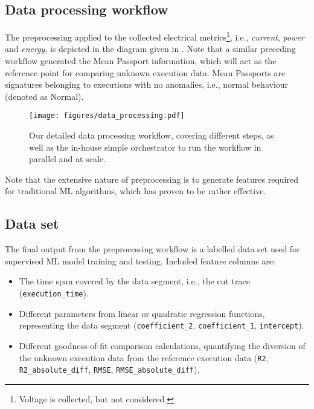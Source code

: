 \subsection{Data processing workflow}
The preprocessing applied to the collected electrical metrics\footnote{Voltage is collected, but not considered.}, i.e., \emph{current}, \emph{power} and \emph{energy}, is depicted in the diagram given in . Note that a similar preceding workflow generated the Mean Passport information, which will act as the reference point for comparing unknown execution data. Mean Passports are signatures belonging to executions with no anomalies, i.e., normal behaviour (denoted as Normal).
%
\begin{figure*}[htbp]
	\centering
	\texttt{[image: figures/data\_processing.pdf]}
	\caption{Our detailed data processing workflow, covering different steps, as well as the in-house simple orchestrator to run the workflow in parallel and at scale.}
	\label{fig:data_processing}
\end{figure*}

Note that the extensive nature of preprocessing is to generate features required for traditional ML algorithms, which has proven to be rather effective.

\subsection{Data set}
The final output from the preprocessing workflow is a labelled data set used for supervised ML model training and testing. Included feature columns are:
%
\begin{itemize}
	\item The time span covered by the data segment, i.e., the cut trace (\texttt{execution\_time}).
    \item Different parameters from linear or quadratic regression functions, representing the data segment (\texttt{coefficient\_2}, \texttt{coefficient\_1}, \texttt{intercept}).
    \item Different goodness-of-fit comparison calculations, quantifying the diversion of the unknown execution data from the reference execution data (\texttt{R2}, \texttt{R2\_absolute\_diff}, \texttt{RMSE}, \texttt{RMSE\_absolute\_diff}).
\end{itemize}

